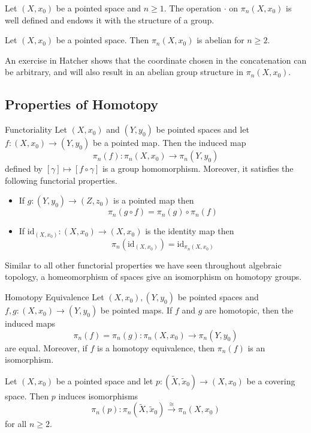 \documentclass[a4paper]{article}
\begin{document}
\begin{thm}{}{} Let $(X,x_0)$ be a pointed space and $n\geq 1$. The operation $\cdot$ on $\pi_n(X,x_0)$ is well defined and endows it with the structure of a group. 
\end{thm}

\begin{prp}{}{} Let $(X,x_0)$ be a pointed space. Then $\pi_n(X,x_0)$ is abelian for $n\geq 2$. 
\end{prp}

An exercise in Hatcher shows that the coordinate chosen in the concatenation can be arbitrary, and will also result in an abelian group structure in $\pi_n(X,x_0)$. 

\subsection{Properties of Homotopy}
\begin{thm}{Functoriality}{} Let $(X,x_0)$ and $(Y,y_0)$ be pointed spaces and let $f:(X,x_0)\to(Y,y_0)$ be a pointed map. Then the induced map $$\pi_n(f):\pi_n(X,x_0)\to\pi_n(Y,y_0)$$ defined by $[\gamma]\mapsto[f\circ\gamma]$ is a group homomorphism. Moreover, it satisfies the following functorial properties. 
\begin{itemize}
\item If $g:(Y,y_0)\to(Z,z_0)$ is a pointed map then $$\pi_n(g\circ f)=\pi_n(g)\circ\pi_n(f)$$
\item If $\text{id}_{(X,x_0)}:(X,x_0)\to(X,x_0)$ is the identity map then $$\pi_n(\text{id}_{(X,x_0)})=\text{id}_{\pi_n(X,x_0)}$$
\end{itemize}
\end{thm}

Similar to all other functorial properties we have seen throughout algebraic topology, a homeomorphism of spaces give an isomorphism on homotopy groups. 

\begin{thm}{Homotopy Equivalence}{} Let $(X,x_0),(Y,y_0)$ be pointed spaces and $f,g:(X,x_0)\to (Y,y_0)$ be pointed maps. If $f$ and $g$ are homotopic, then the induced maps $$\pi_n(f)=\pi_n(g):\pi_n(X,x_0)\to\pi_n(Y,y_0)$$ are equal. Moreover, if $f$ is a homotopy equivalence, then $\pi_n(f)$ is an isomorphism. 
\end{thm}

\begin{prp}{}{} Let $(X,x_0)$ be a pointed space and let $p:(\tilde{X},\tilde{x}_0)\to(X,x_0)$ be a covering space. Then $p$ induces isomorphisms $$\pi_n(p):\pi_n(\tilde{X},\tilde{x}_0)\overset{\cong}{\longrightarrow}\pi_n(X,x_0)$$ for all $n\geq 2$. 
\end{prp}
\end{document}
